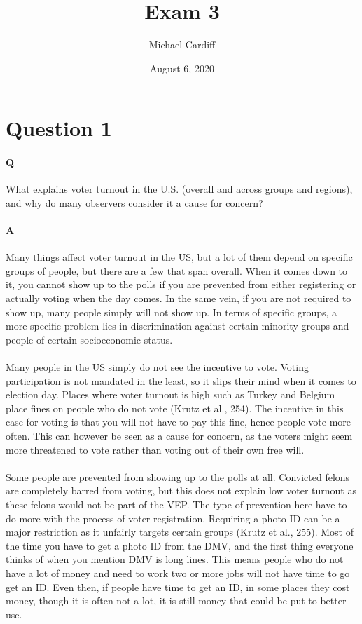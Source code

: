 \documentclass[12pt]{article}
\title{\vspace{-5em} Exam 3}
\author{Michael Cardiff}
\date{August 6, 2020}
\begin{document}
\maketitle
\section*{Question 1}
\paragraph{Q}
What explains voter turnout in the U.S. (overall and across groups and
regions), and why do many observers consider it a cause for concern?
\paragraph{A}
Many things affect voter turnout in the US, but a lot of them depend
on specific groups of people, but there are a few that span
overall. When it comes down to it, you cannot show up to the polls if
you are prevented from either registering or actually voting when the
day comes. In the same vein, if you are not required to show up, many
people simply will not show up. In terms of specific groups, a more
specific problem lies in discrimination against certain minority
groups and people of certain socioeconomic status.
\paragraph{}
Many people in the US simply do not see the incentive to vote. Voting
participation is not mandated in the least, so it slips their mind
when it comes to election day. Places where voter turnout is high such
as Turkey and Belgium place fines on people who do not vote (Krutz et
al., 254). The incentive in this case for voting is that you will not
have to pay this fine, hence people vote more often. This can however
be seen as a cause for concern, as the voters might seem more
threatened to vote rather than voting out of their own free will.
\paragraph{}
Some people are prevented from showing up to the polls at
all. Convicted felons are completely barred from voting, but this does
not explain low voter turnout as these felons would not be part of the
VEP. The type of prevention here have to do more with the process of
voter registration. Requiring a photo ID can be a major restriction as
it unfairly targets certain groups (Krutz et al., 255). Most of the
time you have to get a photo ID from the DMV, and the first thing
everyone thinks of when you mention DMV is long lines. This means
people who do not have a lot of money and need to work two or more
jobs will not have time to go get an ID. Even then, if people have
time to get an ID, in some places they cost money, though it is often
not a lot, it is still money that could be put to better use.
\end{document}
